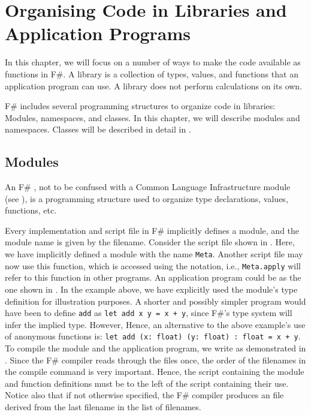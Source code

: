 \documentclass[springer.tex]{subfiles}
\begin{document}
\chapter{Organising Code in Libraries and Application Programs}
\label{chap:modules}
In this chapter, we will focus on a number of ways to make the code available as  functions in F\#. A library is a collection of types, values, and functions that an application program can use. A library does not perform calculations on its own.

F\# includes several programming structures to organize code in libraries: Modules, namespaces, and classes. In this chapter, we will describe modules and namespaces. Classes will be described in detail in .

\section{Modules}
\label{sec:modules}
An F\# , not to be confused with a Common Language Infrastructure module (see ), is a programming structure used to organize type declarations, values, functions, etc. 

Every implementation and script file in F\# implicitly defines a module, and the module name is given by the filename. Consider the script file  shown in .
%
%
Here, we have implicitly defined a module with the name \lstinline{Meta}. Another script file may now use this function, which is accessed using the  notation, i.e., \lstinline{Meta.apply} will refer to this function in other programs. An application program could be as the one shown in .
%
%
In the example above, we have explicitly used the module's type definition for illustration purposes. A shorter and possibly simpler program would have been to define \lstinline{add} as \lstinline{let add x y = x + y}, since F\#'s type system will infer the implied type. However,  Hence, an alternative to the above example's use of anonymous functions is: \lstinline{let add (x: float) (y: float) : float = x + y}. To compile the module and the application program, we write as demonstrated in .
%
%
Since the F\# compiler reads through the files once, the order of the filenames in the compile command is very important. Hence, the script containing the module and function definitions must be to the left of the script containing their use. Notice also that if not otherwise specified, the F\# compiler produces an  file derived from the last filename in the list of filenames.
\end{document}
